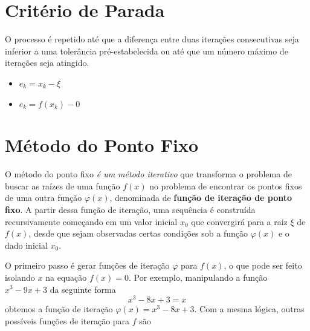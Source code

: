 \section{Critério de Parada}
O processo é repetido até que a diferença entre duas iterações consecutivas seja inferior a uma tolerância pré-estabelecida ou até que um número máximo de iterações seja atingido.

\begin{itemize}
    \item $e_k = x_k - \xi$
    \item $e_k =  f(x_k) - 0$
\end{itemize}


\section{Método do Ponto Fixo}

O método do ponto fixo \emph{é um método iterativo} que %
transforma o problema de buscar as raízes de uma função $f(x)$ no problema de encontrar os pontos fixos de uma outra função $\varphi(x)$, denominada de \textbf{função de iteração de ponto fixo}. 
A partir dessa função de iteração, uma sequência é construída recursivamente começando em um valor inicial $x_0$ que convergirá para a raiz $\xi$ de $f(x)$, desde que sejam observadas certas condições sob a função $\varphi(x)$ e o dado inicial $x_0$.

O primeiro passo é gerar funções de iteração $\varphi$ para $f(x)$, o que pode ser feito isolando $x$ na equação $f(x) = 0$. Por exemplo, manipulando a função $x^3 -9x + 3$  da seguinte forma 
\begin{equation*}
    x^3 - 8x + 3 = x 
\end{equation*} 
obtemos a função de iteração $\varphi(x) = x^3 - 8x + 3$. Com a mesma lógica, outras possíveis funções de iteração para $f$ são

